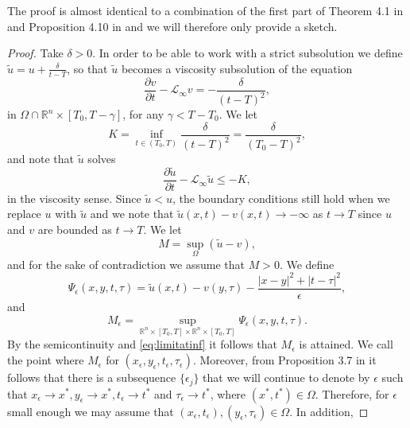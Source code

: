 \documentclass[11pt]{article}
\providecommand{\Linf}{\mathcal{L}_{\infty}}
\providecommand{\Rn}{\mathbb{R}^n}
\numberwithin{equation}{section}
\theoremstyle{definition}
\begin{document}
The proof is almost identical to a combination of the first part of Theorem 4.1 in \cite{KKL2019} and Proposition 4.10 in \cite{HL2016} and we will therefore only provide a sketch. 
\begin{proof}
   Take $\delta >0$. In order to be able to work with a strict subsolution we define $\tilde{u}= u+ \frac{\delta}{t-T}$, so that $\tilde{u}$ becomes a viscosity subsolution of the equation
    \begin{equation*}
        \frac{\partial v}{\partial t}-\Linf v = -\frac{\delta}{(t-T)^2},
    \end{equation*}
    in $\Omega \cap \Rn \times [T_0, T-\gamma]$, for any $\gamma < T-T_0$. We let 
    \begin{equation*}
        K = \inf_{t \in (T_0,T)} \frac{\delta}{(t-T)^2}=\frac{\delta}{(T_0-T)^2},
    \end{equation*}
    and note that $\tilde{u}$ solves
        \begin{equation*}
        \frac{\partial \tilde{u}}{\partial t}-\Linf \tilde{u} \leq -K,
    \end{equation*}
    in the viscosity sense. Since $\tilde{u} < u$, the boundary conditions still hold when we replace $u$ with $\tilde{u}$ and we note that $\tilde{u}(x,t)-v(x,t)\to -\infty$ as $t \to T$ since $u$ and $v$ are bounded as $t \to T$. We let 
    \begin{equation*}
        M= \sup_{\Omega} (\tilde{u}-v),
    \end{equation*}
    and for the sake of contradiction we assume that $M>0$. We define
    \begin{equation*}
        \Psi_{\epsilon}(x,y,t,\tau)= \tilde{u}(x,t)-v(y,\tau)-\frac{|x-y|^2+|t-\tau|^2}{\epsilon},
    \end{equation*}
    and 
    \begin{equation*}
        M_{\epsilon} = \sup_{\Rn \times [T_0,T] \times \Rn \times [T_0,T]} \Psi_{\epsilon}(x,y,t,\tau). 
    \end{equation*}
    By the semicontinuity and \eqref{eq:limitatinf} it follows that $M_{\epsilon}$ is attained. We call the point where $M_{\epsilon}$ for $(x_{\epsilon}, y_{\epsilon}, t_{\epsilon}, \tau_{\epsilon})$. Moreover, from Proposition 3.7 in \cite{CIL1992} it follows that there is a subsequence $\{\epsilon_j \}$ that we will continue to denote by $\epsilon$ such that $x_{\epsilon}\to x^*, y_{\epsilon}\to x^*, t_{\epsilon}\to t^*$ and $\tau_{\epsilon}\to t^*$, where $(x^*, t^*) \in \Omega$. Therefore, for $\epsilon $ small enough we may assume that $(x_{\epsilon}, t_{\epsilon}), (y_{\epsilon}, \tau_{\epsilon}) \in \Omega$. In addition,

\end{proof}
\end{document}
